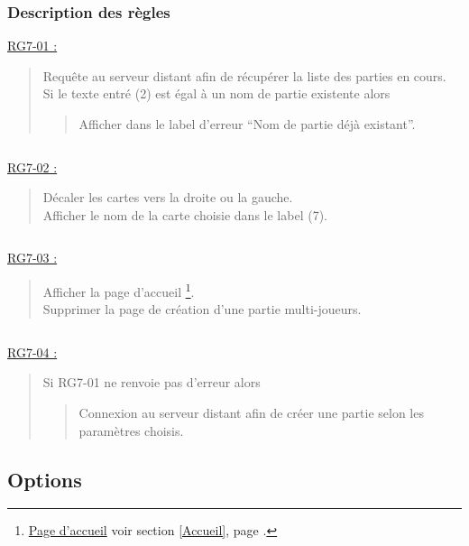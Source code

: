 \documentclass{report}
\begin{document}
		\subsubsection{Description des règles}
		
			\underline{RG7-01 :}
				\begin{quote}
					Requête au serveur distant afin de récupérer la liste des parties en cours.\\
					Si le texte entré (2) est égal à un nom de partie existente alors
					\begin{quote}
						Afficher dans le label d'erreur ``Nom de partie déjà existant''.
					\end{quote}
				\end{quote}

			$\,$				

			\underline{RG7-02 :}
				\begin{quote}
					Décaler les cartes vers la droite ou la gauche.\\
					Afficher le nom de la carte choisie dans le label (7).
				\end{quote}
				
			$\,$				

			\underline{RG7-03 :}
				\begin{quote}
					Afficher la page d'accueil%
						\footnote[1]{
							\hyperlink{Page d'accueil}{Page d'accueil}
							\og voir section \ref{Accueil}, page \pageref{Accueil}.\fg
						}.\\
					Supprimer la page de création d'une partie multi-joueurs.
				\end{quote}
				
			$\,$

			\underline{RG7-04 :}
				\begin{quote}
					 Si RG7-01 ne renvoie pas d'erreur alors 
					 \begin{quote}
					 	Connexion au serveur distant afin de créer une partie selon les paramètres choisis.
					 \end{quote}
				\end{quote}

	 
\newpage

	\subsection{Options}
	
		\hypertarget{Options}{}
		\label{Options}
	
		\begin{center}
			
		\end{center}
				
\end{document}

